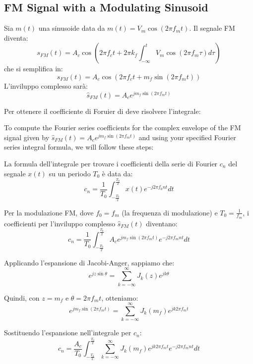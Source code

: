 \subsection*{FM Signal with a Modulating Sinusoid}

Sia \( m(t) \) una sinusoide data da \( m(t) = V_m \cos(2\pi f_m t) \). Il segnale FM diventa:
\[
s_{FM}(t) = A_c \cos \left( 2\pi f_c t + 2\pi k_f \int_{-\infty}^{t} V_m \cos(2\pi f_m \tau) d\tau \right)
\]
che si semplifica in:
\[
s_{FM}(t) = A_c \cos \left(2\pi f_c t + m_f \sin(2\pi f_m t) \right)
\]
L'inviluppo complesso sarà:
\[
\hat{s}_{FM}(t) = A_c e^{j m_f \sin(2\pi f_m t)}
\]


Per ottenere il coefficiente di Foruier di deve risolvere l'integrale:





To compute the Fourier series coefficients for the complex envelope of the FM signal given by \( \hat{s}_{FM}(t) = A_c e^{j m_f \sin(2\pi f_m t)} \) and using your specified Fourier series integral formula, we will follow these steps:


La formula dell'integrale per trovare i coefficienti della serie di Fourier \( c_n \) del segnale \( x(t) \) su un periodo \( T_0 \) è data da:
\[ c_n = \frac{1}{T_0} \int_{-\frac{T_0}{2}}^{\frac{T_0}{2}} x(t) e^{-j 2\pi f_0 n t} dt \]

Per la modulazione FM, dove \( f_0 = f_m \) (la frequenza di modulazione) e \( T_0 = \frac{1}{f_m} \), i coefficienti per l'inviluppo complesso \( \hat{s}_{FM}(t) \) diventano:
\[ c_n = \frac{1}{T_0} \int_{-\frac{T_0}{2}}^{\frac{T_0}{2}} A_c e^{j m_f \sin(2\pi f_m t)} e^{-j 2\pi f_m n t} dt \]

Applicando l'espansione di Jacobi-Anger, sappiamo che:
\[ e^{j z \sin \theta} = \sum_{k=-\infty}^\infty J_k(z) e^{j k \theta} \]

Quindi, con \( z = m_f \) e \( \theta = 2\pi f_m t \), otteniamo:
\[ e^{j m_f \sin(2\pi f_m t)} = \sum_{k=-\infty}^\infty J_k(m_f) e^{j k 2\pi f_m t} \]


Sostituendo l'espansione nell'integrale per \( c_n \):
\[ c_n = \frac{A_c}{T_0} \int_{-\frac{T_0}{2}}^{\frac{T_0}{2}} \sum_{k=-\infty}^\infty J_k(m_f) e^{j k 2\pi f_m t} e^{-j 2\pi f_m n t} dt \]

